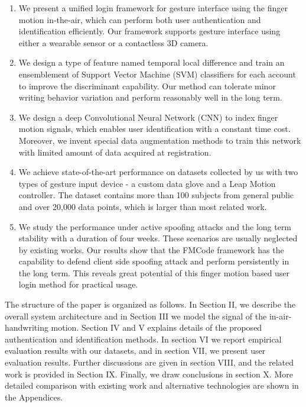 \documentclass[conference]{IEEEtran}
\begin{document}
\begin{enumerate}

\item We present a unified login framework for gesture interface using the finger motion in-the-air, which can perform both user authentication and identification efficiently. Our framework supports gesture interface using either a wearable sensor or a contactless 3D camera.

\item We design a type of feature named temporal local difference and train an ensemblement of Support Vector Machine (SVM) classifiers for each account to improve the discriminant capability. Our method can tolerate minor writing behavior variation and perform reasonably well in the long term.

\item We design a deep Convolutional Neural Network (CNN) to index finger motion signals, which enables user identification with a constant time cost. Moreover, we invent special data augmentation methods to train this network with limited amount of data acquired at registration.
 
\item We achieve state-of-the-art performance on datasets collected by us with two types of gesture input device - a custom data glove and a Leap Motion controller. The dataset contains more than 100 subjects from general public and over 20,000 data points, which is larger than most related work.

\item We study the performance under active spoofing attacks and the long term stability with a duration of four weeks. These scenarios are usually neglected by existing works. Our results show that the FMCode framework has the capability to defend client side spoofing attack and perform persistently in the long term. This reveals great potential of this finger motion based user login method for practical usage.

\end{enumerate}

The structure of the paper is organized as follows. In Section II, we describe the overall system architecture and in Section III we model the signal of the in-air-handwriting motion. Section IV and V explains details of the proposed authentication and identification methods. In section VI we report empirical evaluation results with our datasets, and in section VII, we present user evaluation results. Further discussions are given in section VIII, and the related work is provided in Section IX. Finally, we draw conclusions in section X. More detailed comparison with existing work and alternative technologies are shown in the Appendices.
\end{document}
